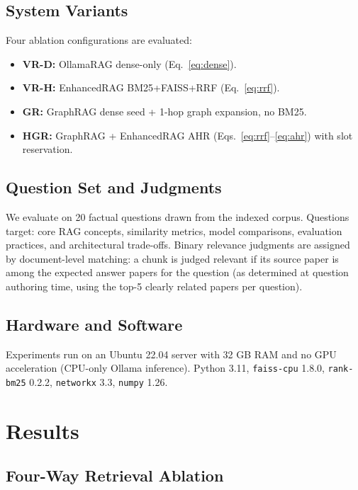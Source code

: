 \documentclass[journal]{IEEEtran}
\begin{document}
\subsection{System Variants}
Four ablation configurations are evaluated:
\begin{itemize}[leftmargin=1.5em,itemsep=1pt]
  \item \textbf{VR-D:} OllamaRAG dense-only (Eq.~\ref{eq:dense}).
  \item \textbf{VR-H:} EnhancedRAG BM25+FAISS+RRF (Eq.~\ref{eq:rrf}).
  \item \textbf{GR:} GraphRAG dense seed + 1-hop graph expansion,
    no BM25.
  \item \textbf{HGR:} GraphRAG + EnhancedRAG AHR
    (Eqs.~\ref{eq:rrf}--\ref{eq:ahr}) with slot reservation.
\end{itemize}

\subsection{Question Set and Judgments}
We evaluate on 20 factual questions drawn from the indexed corpus.
Questions target: core RAG concepts, similarity metrics, model
comparisons, evaluation practices, and architectural trade-offs.
Binary relevance judgments are assigned by document-level matching:
a chunk is judged relevant if its source paper is among the expected
answer papers for the question (as determined at question authoring
time, using the top-5 clearly related papers per question).

\subsection{Hardware and Software}
Experiments run on an Ubuntu 22.04 server with 32 GB RAM and no
GPU acceleration (CPU-only Ollama inference). Python 3.11,
\texttt{faiss-cpu} 1.8.0, \texttt{rank-bm25} 0.2.2,
\texttt{networkx} 3.3, \texttt{numpy} 1.26.

\section{Results}
\label{sec:results}

\subsection{Four-Way Retrieval Ablation}
\end{document}
